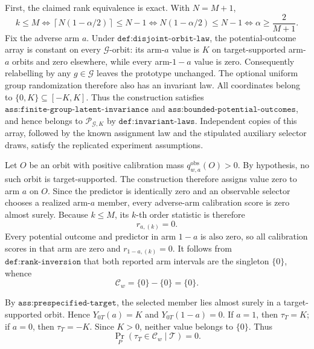 First, the claimed rank equivalence is exact. With \(N=M+1\),
\[k\le M\iff \left\lceil N(1-\alpha/2)\right\rceil\le N-1\iff N(1-\alpha/2)\le N-1\iff \alpha\ge\frac{2}{M+1}.\]
Fix the adverse arm \(a\). Under \(\texttt{def:disjoint-orbit-law}\), the potential-outcome array is constant on every \(\mathcal G\)-orbit: its arm-\(a\) value is \(K\) on target-supported arm-\(a\) orbits and zero elsewhere, while every arm-\(1-a\) value is zero. Consequently relabelling by any \(g\in\mathcal G\) leaves the prototype unchanged. The optional uniform group randomization therefore also has an invariant law. All coordinates belong to \(\{0,K\}\subseteq[-K,K]\). Thus the construction satisfies \(\texttt{ass:finite-group-latent-invariance}\) and \(\texttt{ass:bounded-potential-outcomes}\), and hence belongs to \(\mathcal P_{\mathcal G,K}\) by \(\texttt{def:invariant-laws}\). Independent copies of this array, followed by the known assignment law and the stipulated auxiliary selector draws, satisfy the replicated experiment assumptions.

Let \(O\) be an orbit with positive calibration mass \(q^{\mathrm{obs}}_{w,a}(O)>0\). By hypothesis, no such orbit is target-supported. The construction therefore assigns value zero to arm \(a\) on \(O\). Since the predictor is identically zero and an observable selector chooses a realized arm-\(a\) member, every adverse-arm calibration score is zero almost surely. Because \(k\le M\), its \(k\)-th order statistic is therefore
\[r_{a,(k)}=0.\]
Every potential outcome and predictor in arm \(1-a\) is also zero, so all calibration scores in that arm are zero and \(r_{1-a,(k)}=0\). It follows from \(\texttt{def:rank-inversion}\) that both reported arm intervals are the singleton \(\{0\}\), whence
\[\mathcal C_w=\{0\}-\{0\}=\{0\}.\]

By \(\texttt{ass:prespecified-target}\), the selected member lies almost surely in a target-supported orbit. Hence \(Y_{0T}(a)=K\) and \(Y_{0T}(1-a)=0\). If \(a=1\), then \(\tau_T=K\); if \(a=0\), then \(\tau_T=-K\). Since \(K>0\), neither value belongs to \(\{0\}\). Thus
\[\Pr_P(\tau_T\in\mathcal C_w\mid\mathcal T)=0.\]